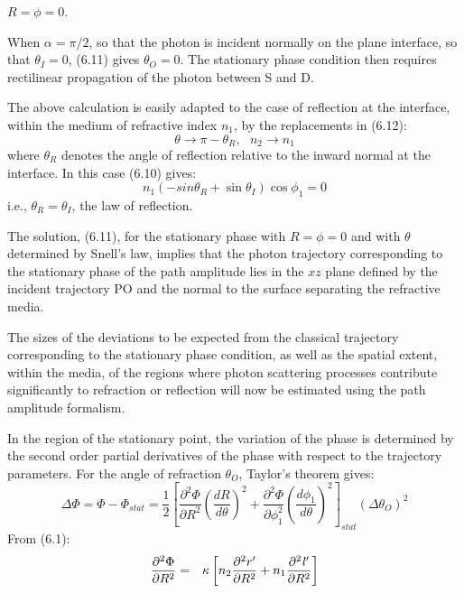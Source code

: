 {  $R = \phi =0$.
  \par When $\alpha = \pi/2$, so that the photon is incident  normally on the plane interface,
   so that $\theta_I =0$,
   (6.11) gives $\theta_O = 0$. The stationary phase condition then 
 requires rectilinear propagation of the photon between S and D. 
  \par The above calculation is easily adapted to the case of reflection at the interface,
   within the medium of refractive index $n_1$, by the replacements in (6.12):
  \[ \theta \rightarrow \pi -\theta_R,~~~n_2 \rightarrow n_1 \]
   where $\theta_R$ denotes the angle of reflection relative to the inward normal at the interface.
   In this case (6.10) gives:
  \begin{equation}
 n_1(-sin \theta_R + \sin  \theta_I) \cos \phi_1 = 0
\end{equation}
 i.e., $ \theta_R =  \theta_I$, the law of reflection.
 \par The solution, (6.11), for the stationary phase with $R = \phi = 0$ and with 
  $\theta$ determined by Snell's law, implies that the photon trajectory
  corresponding to the stationary phase of the path amplitude lies in 
   the $xz$ plane defined by the incident trajectory PO and the normal to the surface
    separating the refractive media.
  \par The sizes of the deviations to be expected from the classical trajectory corresponding
  to the stationary  phase condition, as well as the spatial extent, within the media, of the regions where
  photon scattering processes contribute significantly to refraction or reflection will now be
   estimated using the path amplitude formalism.
  \par In the region of the stationary point, the variation of the phase is determined by the
   second order partial derivatives of the phase with respect to the trajectory parameters.
   For the angle of refraction $\theta_O$, Taylor's theorem gives:
   \begin{equation}
 \Delta \Phi =  \Phi - \Phi_{stat}= \frac{1}{2}\left[\frac{\partial^2 \Phi}{\partial R^2}
  \left(\frac{d R}{d \theta}\right)^2+
 \frac{\partial^2 \Phi}{\partial\phi_1^2}
  \left(\frac{d \phi_1}{d \theta}\right)^2 \right]_{stat} (\Delta \theta_O)^2
 \end{equation}
 From (6.1):
 \begin{eqnarray}
 \frac{\partial^2 \Phi}{\partial R^2} & = & \kappa \left[n_2  \frac{\partial^2 r'}{\partial R^2}
  + n_1  \frac{\partial^2 {\it l}'}{\partial R^2}\right] \\

\end{eqnarray}}
